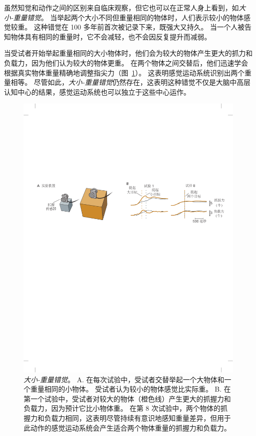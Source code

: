 虽然知觉和动作之间的区别来自临床观察，但它也可以在正常人身上看到，如\textit{大小-重量错觉}。
当举起两个大小不同但重量相同的物体时，人们表示较小的物体感觉较重。
这种错觉在 100 多年前首次被记录下来，既强大又持久。
当一个人被告知物体具有相同的重量时，它不会减轻，也不会因反复提升而减弱。


当受试者开始举起重量相同的大小物体时，他们会为较大的物体产生更大的抓力和负载力，因为他们认为较大的物体更重。
在两个物体之间交替后，他们迅速学会根据真实物体重量精确地调整指尖力（图~\ref{fig:30_7}）。 
这表明感觉运动系统识别出两个重量相等。
尽管如此，\textit{大小-重量错觉}仍然存在，这表明这种错觉不仅是大脑中高层认知中心的结果，感觉运动系统也可以独立于这些中心运作。


\begin{figure}[htbp]
	\centering
	\includegraphics[width=1.0\linewidth]{chap30/fig_30_7}
	\caption{\textit{大小-重量错觉}。
		A. 在每次试验中，受试者交替举起一个大物体和一个重量相同的小物体。
		受试者认为较小的物体感觉比实际重。
		B. 在第一个试验中，受试者对较大的物体（橙色线）产生更大的抓握力和负载力，因为预计它比小物体重。
		在第 8 次试验中，两个物体的抓握力和负载力相同，这表明尽管持续有意识地感知重量差异，但用于此动作的感觉运动系统会产生适合两个物体重量的抓握力和负载力\cite{flanagan2000independence}。}
	\label{fig:30_7}
\end{figure}



